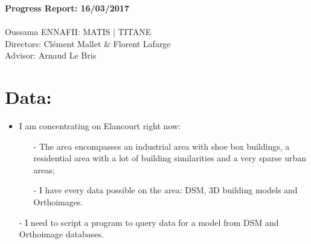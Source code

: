 \documentclass[a4paper, 11pt]{article}
\begin{document}
	\begin{centering}
		\large\textbf{Progress Report: 16/03/2017}\\
		~\\
		Oussama ENNAFII:
		\normalsize MATIS | TITANE \\
		Directors: Cl\'ement Mallet \& Florent Lafarge \\
		Advisor: Arnaud Le Bris \\		
	\end{centering} 


	\section*{Data:}
	
	\begin{itemize}
		\item I am concentrating on Elancourt right now:
		\begin{itemize}
			\item[-] The area encompasses an industrial area with shoe box buildings, a residential area with a lot of building similarities and a very sparse urban areas;
			\item[-] I have every data possible on the area: DSM, 3D building models and Orthoimages.
		\end{itemize}
		\item[-] I need to script a program to query data for a model from DSM and Orthoimage databases.
	\end{itemize}
	
\end{document}
